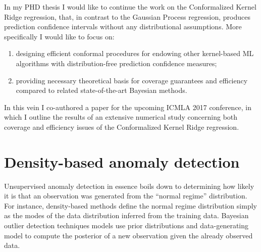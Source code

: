 \documentclass{extarticle}
\begin{document}
In my PHD thesis I would like to continue the work on the Conformalized Kernel Ridge
regression, that, in contrast to the Gaussian Process regression, produces prediction
confidence intervals without any distributional assumptions. More specifically I
would like to focus on: \begin{enumerate}
  \item designing efficient conformal procedures for endowing other kernel-based
  ML algorithms with distribution-free prediction confidence measures;
  \item providing necessary theoretical basis for coverage guarantees and efficiency
  compared to related state-of-the-art Bayesian methods.
\end{enumerate}

In this vein I co-authored a paper for the upcoming ICMLA 2017 conference, in which
I outline the results of an extensive numerical study concerning both coverage and
efficiency issues of the Conformalized Kernel Ridge regression.


\section{Density-based anomaly detection} %
\label{sec:density_based_anomaly_detection}


Unsupervised anomaly detection in essence boils down to determining how likely it
is that an observation was generated from the ``normal regime'' distribution. For
instance, density-based methods define the normal regime distribution simply as
the modes of the data distribution inferred from the training data. Bayesian outlier
detection techniques models use prior distributions and data-generating model to
compute the posterior of a new observation given the already observed data.
\end{document}
